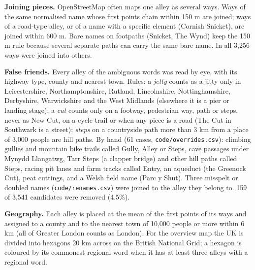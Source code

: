 \documentclass[11pt,a4paper]{article}
\begin{document}
\textbf{Joining pieces.} OpenStreetMap often maps one alley as several ways. Ways of the same normalised name whose first points chain within 150 m are joined; ways of a road-type alley, or of a name with a specific element (Cornish Snicket), are joined within 600 m. Bare names on footpaths (Snicket, The Wynd) keep the 150 m rule because several separate paths can carry the same bare name. In all 3,256 ways were joined into others.

\textbf{False friends.} Every alley of the ambiguous words was read by eye, with its highway type, county and nearest town. Rules: a \textit{jetty} counts as a jitty only in Leicestershire, Northamptonshire, Rutland, Lincolnshire, Nottinghamshire, Derbyshire, Warwickshire and the West Midlands (elsewhere it is a pier or landing stage); a \textit{cut} counts only on a footway, pedestrian way, path or steps, never as New Cut, on a cycle trail or when any piece is a road (The Cut in Southwark is a street); \textit{steps} on a countryside path more than 3 km from a place of 3,000 people are hill paths. By hand (61 cases, \texttt{code/overrides.csv}): climbing gullies and mountain bike trails called Gully, Alley or Steps, cave passages under Mynydd Llangatwg, Tarr Steps (a clapper bridge) and other hill paths called Steps, racing pit lanes and farm tracks called Entry, an aqueduct (the Greenock Cut), peat cuttings, and a Welsh field name (Parc y Shut). Three misspelt or doubled names (\texttt{code/renames.csv}) were joined to the alley they belong to. 159 of 3,541 candidates were removed (4.5\%).

\textbf{Geography.} Each alley is placed at the mean of the first points of its ways and assigned to a county and to the nearest town of 10,000 people or more within 6 km (all of Greater London counts as London). For the overview map the UK is divided into hexagons 20 km across on the British National Grid; a hexagon is coloured by its commonest regional word when it has at least three alleys with a regional word.
\end{document}
